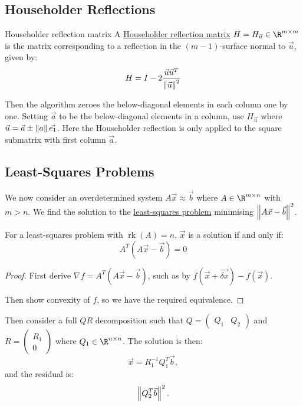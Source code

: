 \documentclass[../Main.tex]{subfiles}
\begin{document}
\subsection{Householder Reflections}
\begin{definition}{Householder reflection matrix}
    A \underline{Householder reflection matrix} $H = H_{\vec{u}} \in \R^{m \times m}$ is the matrix corresponding to a reflection in the $(m-1)$-surface normal to $\vec{u}$, given by:
    \begin{equation*}
        H = I - 2 \frac{\vec{u} \vec{u}^T}{\left\|\vec{u}\right\|^2}
    \end{equation*}
\end{definition}
Then the algorithm zeroes the below-diagonal elements in each column one by one. Setting $\vec{a}$ to be the below-diagonal elements in a column, use $H_{\vec{u}}$ where $\vec{u} = \vec{a} \pm \left\|a\right\|\vec{e_1}$. Here the Householder reflection is only applied to the square submatrix with first column $\vec{a}$.
\subsection{Least-Squares Problems}
We now consider an overdetermined system $A\vec{x} \approx \vec{b}$ where $A \in \R^{m \times n}$ with $m > n$. We find the solution to the \underline{least-squares problem} minimising $\left\|A\vec{x} - \vec{b}\right\|^2$.
\begin{theorem}
    For a least-squares problem with $\operatorname{rk}(A) = n$, $\vec{x}$ is a solution if and only if:
    \begin{equation*}
        A^T(A\vec{x} - \vec{b}) = 0
    \end{equation*}
    \label{thmLeastSquaresProblem}
\end{theorem}
\begin{proof}
    First derive $\nabla f = A^T(A\vec{x} - \vec{b})$, such as by $f(\vec{x} + \vec{\delta x}) - f(\vec{x})$.

    Then show convexity of $f$, so we have the required equivalence.
\end{proof}

Then consider a full $QR$ decomposition such that $Q = \begin{pmatrix}Q_1 & Q_2\end{pmatrix}$ and $R = \begin{pmatrix} R_1 \\ 0\end{pmatrix}$ where $Q_1 \in \R^{n \times n}$. The solution is then:
\begin{equation*}
    \vec{x} = R_1^{-1} Q_1^T \vec{b},
\end{equation*}
and the residual is:
\begin{equation*}
    \left\|Q_2^T \vec{b}\right\|^2.
\end{equation*}
\end{document}
